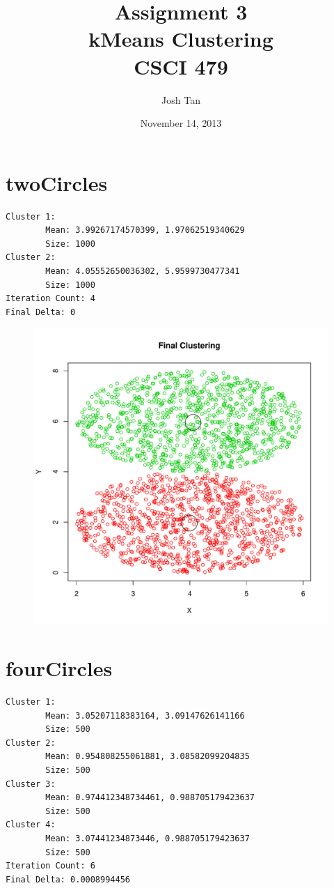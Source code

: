 \documentclass{report}
\title{Assignment 3\\kMeans Clustering\\[1em]CSCI 479}
\author{Josh Tan}
\date{November 14, 2013}
\begin{document}
\maketitle

\section*{twoCircles}

\begin{verbatim}
Cluster 1:
        Mean: 3.99267174570399, 1.97062519340629 
        Size: 1000 
Cluster 2:
        Mean: 4.05552650036302, 5.9599730477341 
        Size: 1000 
Iteration Count: 4 
Final Delta: 0
\end{verbatim}

\begin{figure}[htp!]
  \centering
  \includegraphics[width=0.9\linewidth]{twoCircles}
\end{figure}

\pagebreak

\section*{fourCircles}

\begin{verbatim}
Cluster 1:
        Mean: 3.05207118383164, 3.09147626141166 
        Size: 500 
Cluster 2:
        Mean: 0.954808255061881, 3.08582099204835 
        Size: 500 
Cluster 3:
        Mean: 0.974412348734461, 0.988705179423637 
        Size: 500 
Cluster 4:
        Mean: 3.07441234873446, 0.988705179423637 
        Size: 500 
Iteration Count: 6 
Final Delta: 0.0008994456 
\end{verbatim}
\end{document}
